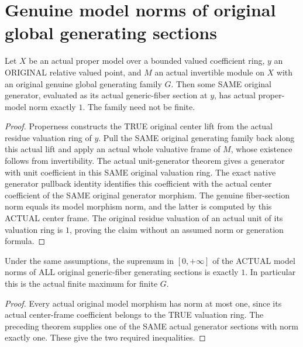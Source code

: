 \section{Genuine model norms of original global generating sections}

\begin{theorem}
\label{thm:actual-model-line-generator-norm-one}
\leanok
{}
Let $X$ be an actual proper model over a bounded valued coefficient ring,
$y$ an ORIGINAL relative valued point, and $M$ an actual invertible module
on $X$ with an original genuine global generating family $G$. Then some
SAME original generator, evaluated as its actual generic-fiber section at
$y$, has actual proper-model norm exactly $1$. The family need not be finite.
\end{theorem}
\begin{proof}
Properness constructs the TRUE original center lift from the actual residue
valuation ring of $y$. Pull the SAME original generating family back along
this actual lift and apply an actual whole valuative frame of $M$, whose
existence follows from invertibility. The actual unit-generator theorem
gives a generator with unit coefficient in this SAME original valuation
ring. The exact native generator pullback identity identifies this
coefficient with the actual center coefficient of the SAME original
generator morphism. The genuine fiber-section norm equals its model
morphism norm, and the latter is computed by this ACTUAL center frame.
The original residue valuation of an actual unit of its valuation ring is
$1$, proving the claim without an assumed norm or generation formula.
\end{proof}

\begin{corollary}
\label{cor:actual-model-line-generators-sup-norm-one}
\leanok
{}
Under the same assumptions, the supremum in $[0,+\infty]$ of the ACTUAL
model norms of ALL original generic-fiber generating sections is exactly
$1$. In particular this is the actual finite maximum for finite $G$.
\end{corollary}
\begin{proof}
Every actual original model morphism has norm at most one, since its
actual center-frame coefficient belongs to the TRUE valuation ring.
The preceding theorem supplies one of the SAME actual generator sections
with norm exactly one. These give the two required inequalities.
\end{proof}

